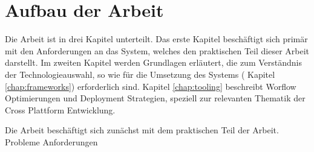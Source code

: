 \section{Aufbau der Arbeit}
Die Arbeit ist in drei Kapitel unterteilt. Das erste Kapitel beschäftigt sich primär mit den
Anforderungen an das System, welches den praktischen Teil dieser Arbeit darstellt.
Im zweiten Kapitel werden Grundlagen erläutert, die zum Verständnis der Technologieauswahl,
so wie für die Umsetzung des Systems ( Kapitel \ref{chap:frameworks}) erforderlich sind. Kapitel \ref{chap:tooling}
beschreibt Worflow Optimierungen und Deployment Strategien, speziell zur relevanten
Thematik der Cross Plattform Entwicklung.

Die Arbeit beschäftigt sich zunächst mit dem praktischen Teil der Arbeit.
Probleme Anforderungen
